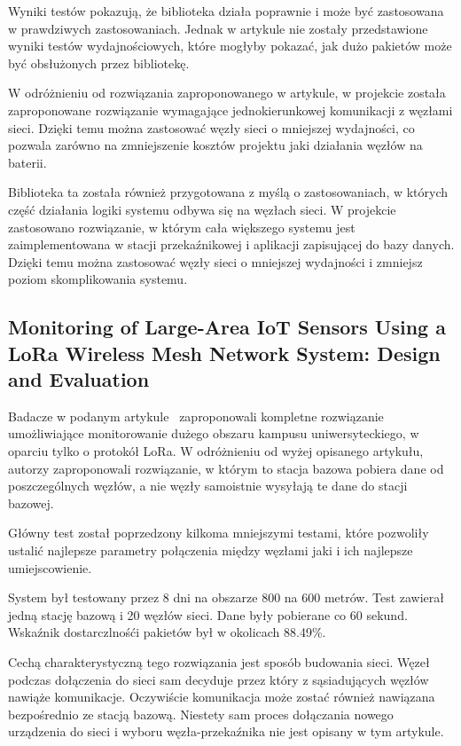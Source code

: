 Wyniki testów pokazują, że biblioteka działa poprawnie i może być zastosowana w prawdziwych zastosowaniach. Jednak w artykule nie zostały przedstawione wyniki testów wydajnościowych, które mogłyby pokazać, jak dużo pakietów może być obsłużonych przez bibliotekę.

W odróżnieniu od rozwiązania zaproponowanego w artykule, w projekcie została zaproponowane rozwiązanie wymagające jednokierunkowej komunikacji z węzłami sieci. Dzięki temu można zastosować węzły sieci o mniejszej wydajności, co pozwala zarówno na zmniejszenie kosztów projektu jaki działania węzłów na baterii.

Biblioteka ta została również przygotowana z myślą o zastosowaniach, w których część działania logiki systemu odbywa się na węzłach sieci. W projekcie zastosowano rozwiązanie, w którym cała większego systemu jest zaimplementowana w stacji przekaźnikowej i aplikacji zapisującej do bazy danych. Dzięki temu można zastosować węzły sieci o mniejszej wydajności i zmniejsz poziom skomplikowania systemu.

\subsection{Monitoring of Large-Area IoT Sensors Using a LoRa Wireless Mesh Network System: Design and Evaluation}

Badacze w podanym artykule~\cite{bib:loramesh-lee} zaproponowali kompletne rozwiązanie umożliwiające monitorowanie dużego obszaru kampusu uniwersyteckiego, w oparciu tylko o protokół LoRa. W odróżnieniu od wyżej opisanego artykułu, autorzy zaproponowali rozwiązanie, w którym to stacja bazowa pobiera dane od poszczególnych węzłów, a nie węzły samoistnie wysyłają te dane do stacji bazowej.

Główny test został poprzedzony kilkoma mniejszymi testami, które pozwoliły ustalić najlepsze parametry połączenia między węzłami jaki i ich najlepsze umiejscowienie.

System był testowany przez 8 dni na obszarze 800 na 600 metrów. Test zawierał jedną stację bazową i 20 węzłów sieci. Dane były pobierane co 60 sekund. Wskaźnik dostarczlnośći pakietów był w okolicach 88.49\%.

Cechą charakterystyczną tego rozwiązania jest sposób budowania sieci. Węzeł podczas dołączenia do sieci sam decyduje przez który z sąsiadujących węzłów nawiąże komunikacje. Oczywiście komunikacja może zostać również nawiązana bezpośrednio ze stacją bazową. Niestety sam proces dołączania nowego urządzenia do sieci i wyboru węzła-przekaźnika nie jest opisany w tym artykule.

